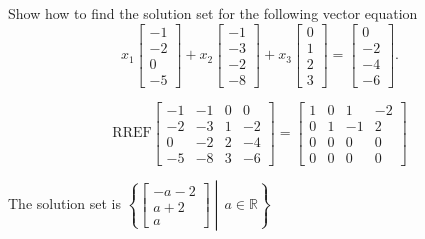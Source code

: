 
\begin{exerciseStatement}


Show how to find the solution set for the following vector equation \[ x_{1} \left[\begin{array}{c}
-1 \\
-2 \\
0 \\
-5
\end{array}\right] + x_{2} \left[\begin{array}{c}
-1 \\
-3 \\
-2 \\
-8
\end{array}\right] + x_{3} \left[\begin{array}{c}
0 \\
1 \\
2 \\
3
\end{array}\right] = \left[\begin{array}{c}
0 \\
-2 \\
-4 \\
-6
\end{array}\right] .\]


\end{exerciseStatement}
    
\begin{exerciseAnswer} 
\[\mathrm{RREF} \left[\begin{array}{ccc|c}
-1 & -1 & 0 & 0 \\
-2 & -3 & 1 & -2 \\
0 & -2 & 2 & -4 \\
-5 & -8 & 3 & -6
\end{array}\right]  =  \left[\begin{array}{ccc|c}
1 & 0 & 1 & -2 \\
0 & 1 & -1 & 2 \\
0 & 0 & 0 & 0 \\
0 & 0 & 0 & 0
\end{array}\right] \]

The solution set is \( \left\{ \left[\begin{array}{c}
-a - 2 \\
a + 2 \\
a
\end{array}\right] \middle|\,a\in\mathbb{R}\right\} \)


\end{exerciseAnswer}
    
